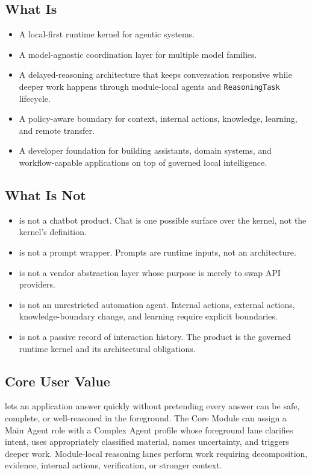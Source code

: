 \subsection{What \Madre Is}

\begin{itemize}
	\item A local-first runtime kernel for agentic systems.
	\item A model-agnostic coordination layer for multiple model families.
	\item A delayed-reasoning architecture that keeps conversation responsive while deeper work happens through module-local agents and \texttt{ReasoningTask} lifecycle.
	\item A policy-aware boundary for context, internal actions, knowledge, learning, and remote transfer.
	\item A developer foundation for building assistants, domain systems, and workflow-capable applications on top of governed local intelligence.
\end{itemize}

\subsection{What \Madre Is Not}

\begin{itemize}
	\item \Madre is not a chatbot product. Chat is one possible surface over the kernel, not the kernel's definition.
	\item \Madre is not a prompt wrapper. Prompts are runtime inputs, not an architecture.
	\item \Madre is not a vendor abstraction layer whose purpose is merely to swap API providers.
	\item \Madre is not an unrestricted automation agent. Internal actions, external actions, knowledge-boundary change, and learning require explicit boundaries.
	\item \Madre is not a passive record of interaction history. The product is the governed runtime kernel and its architectural obligations.
\end{itemize}

\subsection{Core User Value}

\Madre lets an application answer quickly without pretending every answer can be safe, complete, or well-reasoned in the foreground. The Core Module can assign a Main Agent role with a Complex Agent profile whose foreground lane clarifies intent, uses appropriately classified material, names uncertainty, and triggers deeper work. Module-local reasoning lanes perform work requiring decomposition, evidence, internal actions, verification, or stronger context.

